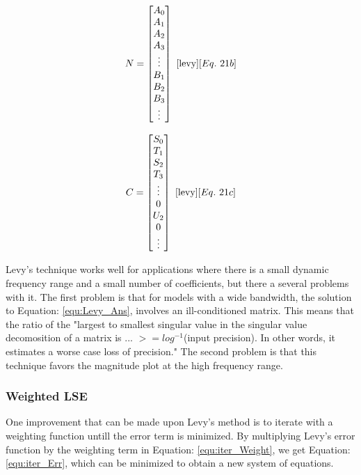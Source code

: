 \begin{multicols}{2}
\begin{equation}
\label{equ:Levy_N}
N = 
\begin{bmatrix}
A_0 \\
A_1 \\
A_2 \\
A_3 \\
\vdots \\
B_1 \\
B_2 \\
B_3 \\
\vdots
\end{bmatrix}
~\cite{levy}[Eq.~21b]
\end{equation}

\begin{equation}
\label{equ:Levy_C}
C = 
\begin{bmatrix}
S_0 \\
T_1 \\
S_2 \\
T_3 \\
\vdots \\
0   \\
U_2 \\
0   \\
\vdots
\end{bmatrix}
~\cite{levy}[Eq.~21c]
\end{equation}
\end{multicols}

Levy's technique works well for applications where there is a small dynamic frequency range and a small number of coefficients, but there a several problems with it.
The first problem is that for models with a wide bandwidth, the solution to Equation: \eqref{equ:Levy_Ans}, involves an ill-conditioned matrix. This means that the ratio of the "largest to smallest singular value in the singular value decomosition of a matrix is ... $>= log^{-1}$(input precision). In other words, it estimates a worse case loss of precision."
The second problem is that this technique favors the magnitude plot at the high frequency range. 



\subsubsection{Weighted LSE}
One improvement that can be made upon Levy's method is to iterate with a weighting function untill the error term is minimized\cite{levy_iter}. By multiplying Levy's error function by the weighting term in Equation: \eqref{equ:iter_Weight}, we get Equation: \eqref{equ:iter_Err}, which can be minimized to obtain a new system of equations.

